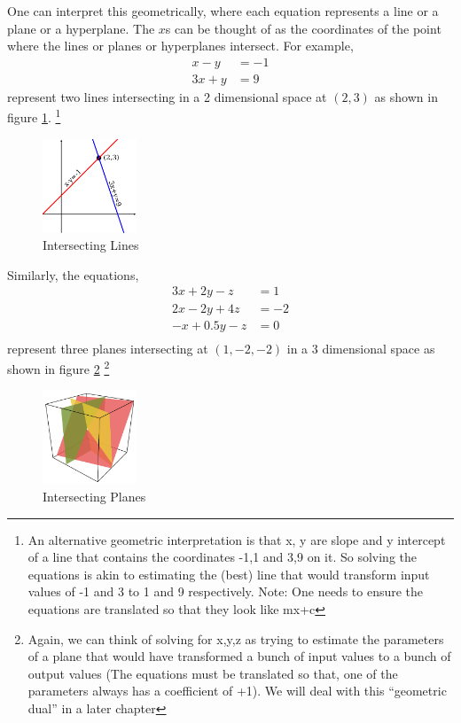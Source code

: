 One can interpret this geometrically, where each equation represents a line or a plane or a hyperplane. The \(x\)s can be thought of as the coordinates of the point where the lines or planes or hyperplanes intersect. For example,
	\begin{align*}
	x - y &= -1 \\
	3x+y &= 9
	\end{align*}
represent two lines intersecting in a 2 dimensional space at \((2,3)\) as shown in figure \ref{fig:lines_unique_solution}. \footnote{An alternative geometric interpretation is that x, y are slope and y intercept of a line that contains the coordinates {-1,1} and {3,9} on it. So solving the equations is akin to estimating the (best) line that would transform input values of -1 and 3 to 1 and 9 respectively. Note: One needs to ensure the equations are translated so that they look like mx+c}
	\begin{figure}[h!]
	  \centering
	    \includegraphics[width=0.25\textwidth]{Linear_Algebra/intersecting_lines}
	  \caption{Intersecting Lines}
	  \label{fig:lines_unique_solution}
	\end{figure}	
Similarly, the equations,
	\begin{align*}
	3x + 2y - z  &= 1 \\
	2x -2y + 4z &= -2 \\
	-x + 0.5y -z &= 0 \\
	\end{align*}
represent three planes intersecting at \((1,-2,-2)\) in a 3 dimensional space as shown in figure \ref{fig:planes_unique_solution} \footnote{Again, we can think of solving for x,y,z as trying to estimate the parameters of a plane that would have transformed a bunch of input values to a bunch of output values (The equations must be translated so that, one of the parameters always has a coefficient of +1). We will deal with this ``geometric dual'' in a later chapter}
	\begin{figure}[h!]
	\centering
	\includegraphics[width=0.25\textwidth]{Linear_Algebra/intersecting_planes}
	\caption{Intersecting Planes}
	\label{fig:planes_unique_solution}
	\end{figure}

